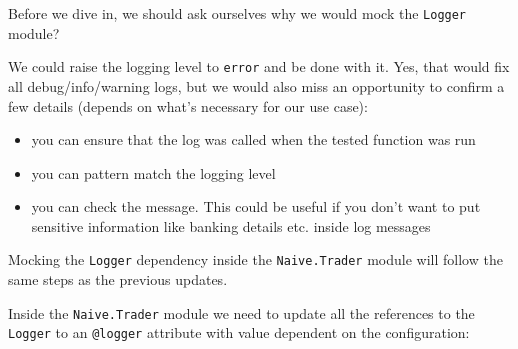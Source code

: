 \documentclass[
  oneside]{book}
\providecommand{\tightlist}{%
  \setlength{\itemsep}{0pt}\setlength{\parskip}{0pt}}
\begin{document}
Before we dive in, we should ask ourselves why we would mock the \texttt{Logger} module?

We could raise the logging level to \texttt{error} and be done with it. Yes, that would fix all debug/info/warning logs, but we would also miss an opportunity to confirm a few details (depends on what's necessary for our use case):

\begin{itemize}
\tightlist
\item
  you can ensure that the log was called when the tested function was run
\item
  you can pattern match the logging level
\item
  you can check the message. This could be useful if you don't want to put sensitive information like banking details etc. inside log messages
\end{itemize}

Mocking the \texttt{Logger} dependency inside the \texttt{Naive.Trader} module will follow the same steps as the previous updates.

Inside the \texttt{Naive.Trader} module we need to update all the references to the \texttt{Logger} to an \texttt{@logger} attribute with value dependent on the configuration:
\end{document}
